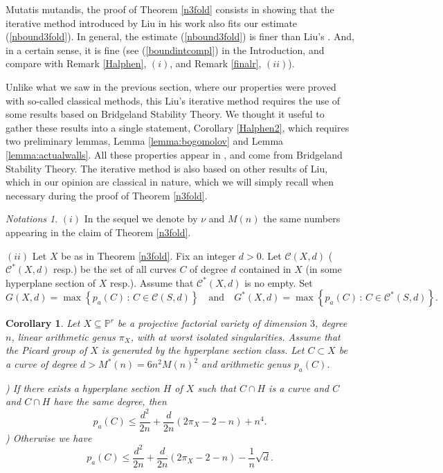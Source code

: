 \documentclass[9pt,a4paper]{amsart}
\theoremstyle{plain}
\newtheorem{corollary}[theorem]{Corollary}
\theoremstyle{definition}
\theoremstyle{remark}
\newtheorem{notations}[theorem]{Notations}
\begin{document}
Mutatis mutandis, the proof of Theorem \ref{n3fold} consists in
showing that the iterative method introduced by Liu in his work
\cite[Proof of Theorem 4.9.]{Liu} also fits our estimate
(\ref{nbound3fold}). In general, the estimate (\ref{nbound3fold}) is
finer than Liu's \cite[Theorem 4.9. and Corollary 4.11.]{Liu}. And,
in a certain sense, it is fine (see (\ref{boundintcompl}) in the Introduction,
and compare with Remark \ref{Halphen},
$(i)$, and Remark \ref{finalr}, $(ii)$).

Unlike what we saw in the previous section, where our properties
were proved with so-called classical methods, this Liu's iterative
method requires the use of some results based on Bridgeland
Stability Theory. We thought it useful to gather these results into
a single statement, Corollary \ref{Halphen2}, which requires two
preliminary lemmas, Lemma \ref{lemma:bogomolov} and Lemma
\ref{lemma:actualwalls}. All these properties appear in \cite{Liu},
and come from Bridgeland Stability Theory. The iterative method is
also based on other results of Liu, which in our opinion are
classical in nature, which we will simply recall when necessary
during the proof of Theorem \ref{n3fold}.


\begin{notations} $(i)$ In the sequel we denote by $\nu$ and $M(n)$
the same numbers appearing in the claim of Theorem \ref{n3fold}.

\smallskip
$(ii)$ Let $X$ be as in Theorem \ref{n3fold}. Fix an integer $d>0$.
Let $\mathcal C(X,d)$ ($\mathcal C^*(X,d)$ resp.) be the set of all
curves $C$ of degree $d$ contained in $X$ (in some hyperplane
section of $X$ resp.). Assume that $\mathcal C^*(X,d)$ is no empty.
Set
$$
G(X,d)=\max\left\{p_a(C)\,:\, C\in \mathcal C(S,d)\right\}\quad
{\text{and}}\quad G^*(X,d)=\max\left\{p_a(C)\,:\, C\in \mathcal
C^*(S,d)\right\}.
$$
\end{notations}


\smallskip
\begin{corollary}\label{cor1}
Let $X\subseteq\mathbb P^r$ be a projective factorial  variety of
dimension $3$, degree $n$, linear arithmetic genus $\pi_X$, with at
worst isolated singularities. Assume that the Picard group of $X$ is
generated by the hyperplane section class. Let $C\subset X$ be a
curve of degree $d>M^*(n)=6n^2M(n)^2$ and arithmetic genus
$p_a(C)$.

) If there exists a hyperplane section $H$ of $X$ such that $C\cap
H$ is a curve and $C$ and $C\cap H$ have the same degree, then
$$
p_a(C) \leq \frac{d^2}{2n}+\frac{d}{2n}\left(2\pi_X-2-n\right)+n^4.
$$
) Otherwise we have
$$
p_a(C) \leq
\frac{d^2}{2n}+\frac{d}{2n}\left(2\pi_X-2-n\right)-\frac{1}{n}\sqrt{d}.
$$
\end{corollary}
\end{document}
